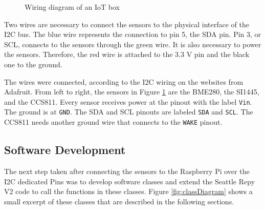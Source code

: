 \documentclass{article}      %
\begin{document}
\begin{figure}[ht]
	\caption{Wiring diagram of an \gls{IoT} box}
	\label{fig:wiring}
\end{figure}

Two wires are necessary to connect the sensors to the physical interface of the \gls{I2C} bus. The blue wire represents the connection to pin 5, the \gls{SDA} pin. Pin 3, or \gls{SCL}, connects to the sensors through the green wire. It is also necessary to power the sensors. Therefore, the red wire is attached to the 3.3 \gls{V} pin and the black one to the ground.

The wires were connected, according to the \gls{I2C} wiring on the websites from Adafruit. From left to right, the sensors in Figure \ref{fig:wiring} are the BME280, the SI1445, and the CCS811. Every sensor receives power at the pinout with the label \texttt{Vin}. The ground is at \texttt{GND}. The \gls{SDA} and \gls{SCL} pinouts are labeled \texttt{SDA} and \texttt{SCL}. The CCS811 needs another ground wire that connects to the \texttt{WAKE} pinout. \cite{bme280} \cite{ccs811} \cite{si1145}

\subsection{Software Development}

The next step taken after connecting the sensors to the Raspberry Pi over the \gls{I2C} dedicated Pins was to develop software classes and extend the Seattle \gls{Repy} V2 code to call the functions in these classes. Figure \ref{fig:classDiagram} shows a small excerpt of these classes that are described in the following sections.
\end{document}
